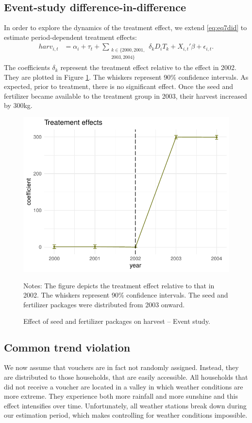 \subsection*{Event-study difference-in-difference}

In order to explore the dynamics of the treatment effect, we extend \eqref{eq:eq7did} to estimate period-dependent treatment effects:\begin{align}
	\label{eq:eq7did_event}
	harv_{i,t} &= \alpha_i + \tau_t + \sum_{\substack{k\in  \{2000,2001, \\2003,2004\}}}\delta_k D_{i} T_k + X_{i,t}'\beta + \epsilon_{i,t}.
\end{align}
The coefficients $\delta_k$ represent the treatment effect relative to the effect in 2002. They are plotted in Figure \ref{fig:did_c}. The whiskers represent 90\% confidence intervals. As expected, prior to treatment, there is no significant effect. Once the seed and fertilizer became available to the treatment group in 2003, their harvest increased by 300kg.


\begin{figure}[htb]
	\begin{center}
		\includegraphics[width=0.55\linewidth]{../figures/part5c.pdf}
	\end{center}
	\caption{Effect of seed and fertilizer packages on harvest -- Event study.}
	\label{fig:did_c}	{\footnotesize Notes: The figure depicts the treatment effect relative to that in 2002. The whiskers represent 90\% confidence intervals. The seed and fertilizer packages were distributed from 2003 onward.}
\end{figure}


\subsection*{Common trend violation}

We now assume that vouchers are in fact not randomly assigned. Instead, they are distributed to those households, that are easily accessible. All households that did not receive a voucher are located in a valley in which weather conditions are more extreme. They experience both more rainfall and more sunshine and this effect intensifies over time. Unfortunately, all weather stations break down during our estimation period, which makes controlling for weather conditions impossible. 

